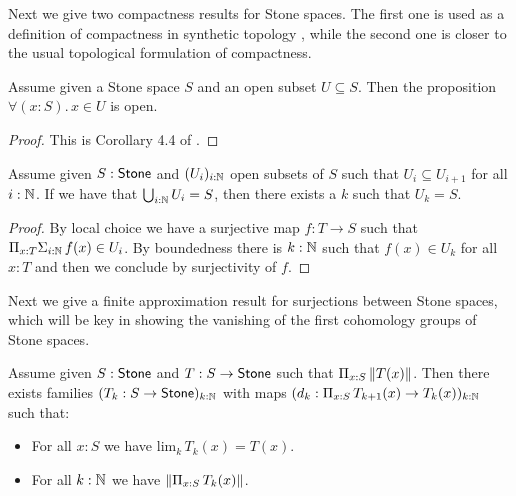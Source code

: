 Next we give two compactness results for Stone spaces. The first one is used as a definition of compactness in synthetic topology \parencite[Definition 2.5]{lesnik2021synthetictopologyconstructivemetric}, while the second one is closer to the usual topological formulation of compactness.

\begin{lemma}\label{compact-hausdorff-compact}
Assume given a Stone space $S$ and an open subset $U\subseteq S$. Then the proposition $\forall(x:S).\, x\in U$ is open.
\end{lemma}

\begin{proof}
This is Corollary 4.4 of \cite{synthetic-stone-duality}.
\end{proof}

\begin{lemma}\label{compact-hausforff-countable-cover}
Assume given $S:\mathsf{Stone}$ and $(U_i)_{i:\mathbb{N}}$ open subsets of $S$ such that $U_i\subseteq U_{i+1}$ for all $i:\mathbb{N}$. 
If we have that $\bigcup_{i:\mathbb{N}}U_i = S$, then there exists a $k$ such that $U_k=S$.
\end{lemma}

\begin{proof}
By local choice we have a surjective map $f: T \to S$
such that $\Pi_{x:T} \Sigma_{i:\mathbb{N}}\, f(x)\in U_i$. By boundedness there is $k:\mathbb{N}$ such that $f(x)\in U_k$ for all $x:T$
and then we conclude by surjectivity of $f$.
\end{proof}

Next we give a finite approximation result for surjections between Stone spaces, which will be key in showing the vanishing of the first cohomology groups of Stone spaces.

\begin{lemma}\label{finite-approximation-stone-surjection-cohomology}
Assume given $S:\mathsf{Stone}$ and $T:S\to \mathsf{Stone}$ such that $\Pi_{x:S}\, \lVert T(x) \rVert$. Then there exists families $(T_k: S\to \mathsf{Stone})_{k:\mathbb{N}}$ with maps $(d_k:\Pi_{x:S}\, T_{k+1}(x)\to T_k(x))_{k:\mathbb{N}}$ such that:

\begin{itemize} 
\item For all $x:S$ we have $\mathrm{lim}_k\, T_k(x) = T(x)$.
\item For all $k:\mathbb{N}$ we have $\lVert \Pi_{x:S}\, T_k(x) \rVert$.
\end{itemize}
\end{lemma}

